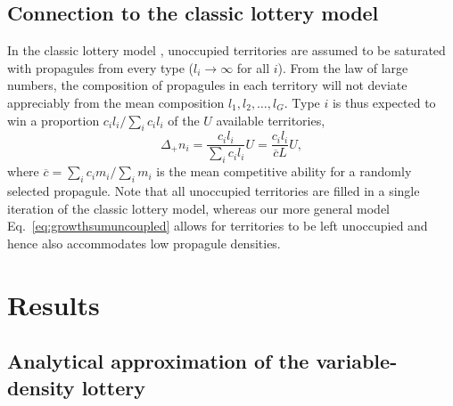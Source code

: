 \documentclass[12pt]{article}
\begin{document}
\subsection*{Connection to the classic lottery model}

In the classic lottery model \citep{chesson_1981}, unoccupied territories are assumed to be saturated with propagules from every type ($l_i\rightarrow \infty$ for all $i$). From the law of large numbers, the composition of propagules in each territory will not deviate appreciably from the mean composition $l_1,l_2,\ldots,l_G$. Type $i$ is thus expected to win a proportion $c_i l_i/\sum_i c_i l_i$ of the $U$ available territories,
\begin{equation}
\Delta_+ n_i=\frac{c_i l_i}{\sum_i c_i l_i}U=\frac{c_i l_i}{\overline{c}L}U, \label{eq:lottery}
\end{equation}
where $\overline{c}=\sum_i c_i m_i/\sum_i m_i$ is the mean competitive ability for a randomly selected propagule. Note that all unoccupied territories are filled in a single iteration of the classic lottery model, whereas our more general model Eq.~\eqref{eq:growthsumuncoupled} allows for territories to be left unoccupied and hence also accommodates low propagule densities.

\section*{Results}

\subsection*{Analytical approximation of the variable-density lottery}
\end{document}
